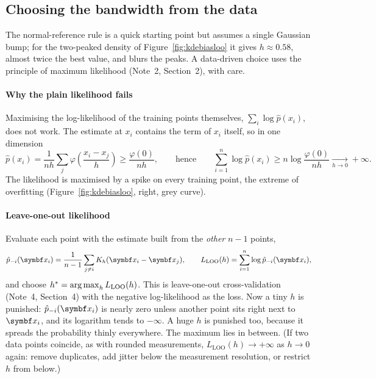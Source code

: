 \documentclass[11pt]{article}
\begin{document}
\subsection{Choosing the bandwidth from the data}\label{sec:bandwidth}

The normal-reference rule is a quick starting point but assumes a single Gaussian bump; for the two-peaked density
of Figure~\ref{fig:kdebiasloo} it gives $h \approx 0.58$, almost twice the best value, and blurs the peaks. A data-driven
choice uses the principle of maximum likelihood (Note~2, Section~2), with care.

\paragraph{Why the plain likelihood fails} Maximising the log-likelihood of the training points themselves,
$\sum_i \log \hat p(x_i)$, does not work. The estimate at $x_i$ contains the term of $x_i$ itself, so in one dimension
\[
  \hat p(x_i) = \frac{1}{nh} \sum_{j} \varphi\!\left(\frac{x_i - x_j}{h}\right) \ge \frac{\varphi(0)}{nh},
  \qquad\text{hence}\qquad \sum_{i=1}^n \log \hat p(x_i) \ge n \log \frac{\varphi(0)}{nh} \xrightarrow[h \to 0]{} +\infty .
\]
The likelihood is maximised by a spike on every training point, the extreme of overfitting (Figure~\ref{fig:kdebiasloo},
right, grey curve).

\paragraph{Leave-one-out likelihood} Evaluate each point with the estimate built from the \emph{other} $n-1$ points,
\[
  \hat p_{-i}(\x_i) = \frac{1}{n-1} \sum_{j \ne i} K_h(\x_i - \x_j), \qquad
  L_{\mathrm{LOO}}(h) = \sum_{i=1}^n \log \hat p_{-i}(\x_i),
\]
and choose $h^* = \operatorname*{arg\,max}_h L_{\mathrm{LOO}}(h)$. This is leave-one-out cross-validation (Note~4, Section~4) with the
negative log-likelihood as the loss. Now a tiny $h$ is punished: $\hat p_{-i}(\x_i)$ is nearly zero unless another
point sits right next to $\x_i$, and its logarithm tends to $-\infty$. A huge $h$ is punished too, because it spreads
the probability thinly everywhere. The maximum lies in between. (If two data points coincide, as with rounded
measurements, $L_{\mathrm{LOO}}(h) \to +\infty$ as $h \to 0$ again: remove duplicates, add jitter below the
measurement resolution, or restrict $h$ from below.)
\end{document}

